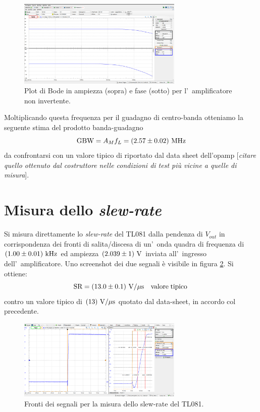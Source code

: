 \documentclass[10pt,a4paper]{article}
\newcommand{\rem}[1]{[\emph{#1}]}
\newcommand{\exn}{\phantom{xxx}}
\begin{document}
\begin{figure}[h]
\begin{center}
\includegraphics[width=0.7\textwidth]{bode.jpeg}
\caption{\small Plot di Bode in ampiezza (sopra) e fase (sotto) per l'~amplificatore non invertente.}
\label{fig:bodenoninv}
\end{center}
\end{figure}
%
Moltiplicando questa frequenza per il guadagno di centro-banda otteniamo la seguente stima del prodotto banda-guadagno
\[
\mbox{GBW} = A_M f_L = (2.57 \pm 0.02)\ \rm MHz
\]
da confrontarsi con un valore tipico di \exn riportato dal data sheet dell'opamp \rem{citare quello ottenuto dal costruttore nelle 
condizioni di test pi\`u vicine a quelle di misura}.
%
\section{Misura dello \emph{slew-rate}}
Si misura direttamente lo \emph{slew-rate} del TL081 dalla pendenza di $V_{out}$ in corrispondenza dei fronti di salita/discesa 
di un'~onda quadra di frequenza di $(1.00 \pm 0.01) \ \rm kHz$ ed ampiezza $(2.039 \pm 1) \ \rm V$ inviata all'~ingresso 
dell'~amplificatore. Uno screenshot dei due segnali \`e visibile in figura \ref{fig:slew}. Si ottiene:
\[
\mbox{SR} = (13.0 \pm 0.1 )\ \rm V/\mu s \quad \mathrm{valore \; tipico}\, 
\]
contro un valore tipico di $(13 ) \  \rm V/\mu s$ quotato dal data-sheet, in accordo col precedente.
%
\begin{figure}[h]
\begin{center}
\includegraphics[width=0.7\textwidth]{slewrate.png}
\caption{\small Fronti dei segnali per la misura dello slew-rate del TL081.}
\label{fig:slew}
\end{center}
\end{figure}
%
\end{document}
